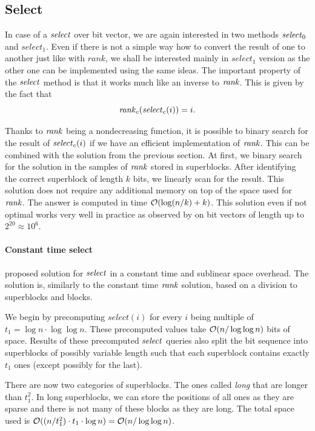 \subsection{Select}
\label{section:select}

In case of a $\mathit{select}$ over bit vector, we are again interested in two methods $\mathit{select}_0$
and $select_1$. Even if there is not a simple way how to convert the result of one to
another just like with $rank$, we shall be interested mainly in $select_1$ version as the
other one can be implemented using the same ideas. The important property of the $\mathit{select}$
method is that it works much like an inverse to $\mathit{rank}$. This is given by the fact that
$$\mathit{rank}_c(\mathit{select}_c(i)) = i.$$

Thanks to $\mathit{rank}$ being a nondecreasing function, it is possible to binary search for the
result of $\mathit{select}_c(i)$ if we have an efficient implementation of $\mathit{rank}$. This can be combined
with the solution from the previous section. At first, we binary search for the solution in the
samples of $\mathit{rank}$ stored in superblocks. After identifying the correct superblock of length $k$
bits, we linearly scan for the result. This solution does not require any additional memory on top
of the space used for $\mathit{rank}$. The answer is computed in time $\mathcal{O}(\log(n/k)+k)$. This solution
even if not optimal works very well in practice as observed by \cite{gonzalez2005practical} on bit
vectors of length up to $2^{20}\approx 10^6$.

\paragraph{Constant time select}

\cite{clark1997compact} proposed solution for $\mathit{select}$ in a constant time and sublinear space
overhead. The solution is, similarly to the constant time $\mathit{rank}$ solution, based on a division
to superblocks and blocks.

We begin by precomputing $select(i)$ for every $i$ being multiple of $t_1=\log n\cdot \log\log n$.
These precomputed values take $\mathcal{O}(n/\log\log n)$ bits of space. Results of these precomputed
$\mathit{select}$ queries also split the bit sequence into superblocks of possibly variable length such that
each superblock contains exactly $t_1$ ones (except possibly for the last).

There are now two categories of superblocks. The ones called \textit{long} that are longer
than $t_1^2$. In long superblocks, we can store the positions of all ones as they are sparse
and there is not many of these blocks as they are long. The total space used is $\mathcal{O}((n/t_1^2)\cdot t_1\cdot
\log n) = \mathcal{O}(n/\log\log n)$.

